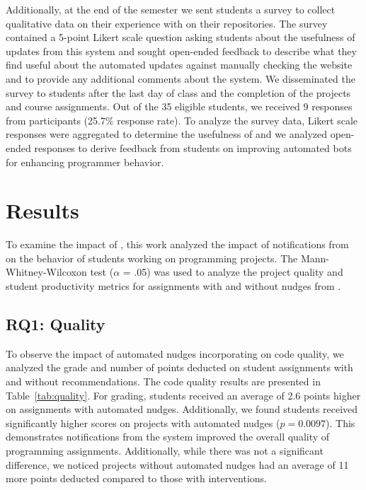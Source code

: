Additionally, at the end of the semester we sent students a survey to collect qualitative data on their experience with
\tooltwo on their repositories. The survey contained a 5-point Likert scale question asking students about the
usefulness of updates from this system and sought open-ended feedback to describe what they find useful about the automated updates against manually checking the website and to provide any additional comments about the system. We disseminated the survey to students after the last day of class and the completion of the projects and course assignments. Out of the 35 eligible students, we received 9 responses from participants (25.7\% response rate). To analyze the survey data, Likert scale responses were aggregated to determine the usefulness of \tooltwo and we analyzed open-ended responses to derive feedback from students on improving automated bots for enhancing programmer behavior. 

\section{Results}

To examine the impact of \framework, this work analyzed the impact of notifications from \tooltwo on the behavior of students working on programming projects. The Mann-Whitney-Wilcoxon test ($\alpha$ = .05) was used to analyze the project quality and student productivity metrics for assignments with and without nudges from \tooltwo.

\subsection{RQ1: Quality}

To observe the impact of automated nudges incorporating \framework on code quality, we analyzed the grade and number of points deducted on student assignments with and without \tooltwo recommendations. The code quality results are presented in Table~\ref{tab:quality}. For grading, students received an average of 2.6 points higher on assignments with automated nudges. Additionally, we found students received significantly higher scores on projects with automated nudges ($p = 0.0097$). This demonstrates notifications from the \tooltwo system improved the overall quality of programming assignments. Additionally, while there was not a significant difference, we noticed projects without automated nudges had an average of 11 more points deducted compared to those with \tooltwo interventions.

